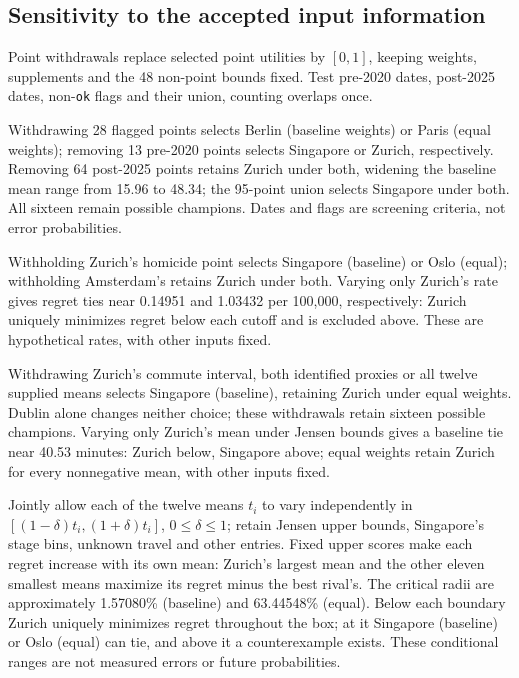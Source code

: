 \subsection{Sensitivity to the accepted input information}\label{sec:sourcepolicy}
Point withdrawals replace selected point utilities by $[0,1]$, keeping weights,
supplements and the 48 non-point bounds fixed. Test pre-2020 dates, post-2025
dates, non-\texttt{ok} flags and their union, counting overlaps once.



Withdrawing 28 flagged points selects Berlin (baseline weights) or Paris
(equal weights); removing 13 pre-2020 points selects Singapore or Zurich,
respectively. Removing 64 post-2025 points retains Zurich under both,
widening the baseline mean range from 15.96 to 48.34; the 95-point union
selects Singapore under both. All sixteen remain possible champions.
Dates and flags are screening criteria, not error probabilities.

Withholding Zurich's homicide point selects Singapore (baseline) or Oslo
(equal); withholding Amsterdam's retains Zurich under both. Varying only
Zurich's rate gives regret ties near 0.14951 and 1.03432 per 100,000,
respectively: Zurich uniquely minimizes regret below each cutoff and is
excluded above. These are hypothetical rates, with other inputs fixed.

Withdrawing Zurich's commute interval, both identified proxies or all twelve
supplied means selects Singapore (baseline), retaining Zurich under equal
weights. Dublin alone changes neither choice; these withdrawals retain sixteen
possible champions. Varying only Zurich's mean under Jensen bounds gives a baseline tie
near 40.53 minutes: Zurich below, Singapore above; equal weights retain
Zurich for every nonnegative mean, with other inputs fixed.

Jointly allow each of the twelve means $t_i$ to vary independently in
$[(1-\delta)t_i,(1+\delta)t_i]$, $0\leq\delta\leq1$; retain Jensen upper bounds,
Singapore's stage bins, unknown travel and other entries. Fixed upper scores
make each regret increase with its own mean: Zurich's largest mean and the
other eleven smallest means maximize its regret minus the best rival's.
The critical radii are approximately 1.57080\% (baseline) and 63.44548\% (equal).
Below each boundary Zurich uniquely minimizes regret throughout the box;
at it Singapore (baseline) or Oslo (equal) can tie, and above it a counterexample exists.
These conditional ranges are not measured errors or future probabilities.
